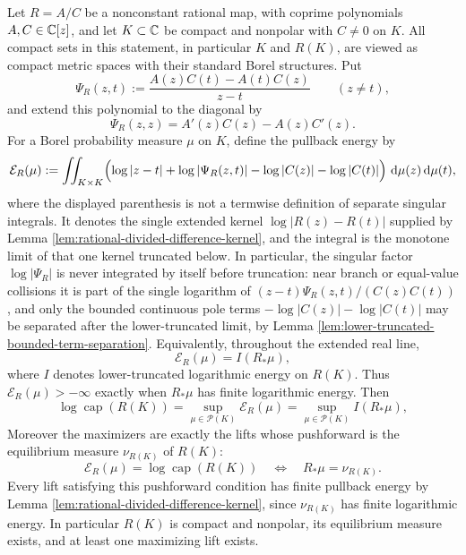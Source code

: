 \begin{proposition}\label{prop:general-rational-image-capacity-pullback}
Let \(R=A/C\) be a nonconstant rational map, with coprime polynomials \(A,C\in\mathbb{C}[z]\), and let \(K\subset\mathbb{C}\) be compact and nonpolar with \(C\ne0\) on \(K\).  All compact sets in this statement, in particular \(K\) and \(R(K)\), are viewed as compact metric spaces with their standard Borel structures.  Put
\[
\Psi_R(z,t):=\frac{A(z)C(t)-A(t)C(z)}{z-t}\qquad (z\ne t),
\]
and extend this polynomial to the diagonal by
\[
\Psi_R(z,z)=A'(z)C(z)-A(z)C'(z).
\]
For a Borel probability measure \(\mu\) on \(K\), define the pullback energy by
\[
\mathcal E_R(\mu):=\iint_{K\times K}
\Bigl(\log|z-t|+\log|\Psi_R(z,t)|-\log|C(z)|-\log|C(t)|\Bigr)
\,\,\mathrm{d}\mu(z)\,\mathrm{d}\mu(t),
\]
where the displayed parenthesis is not a termwise definition of separate singular integrals.  It denotes the single extended kernel \(\log|R(z)-R(t)|\) supplied by Lemma \ref{lem:rational-divided-difference-kernel}, and the integral is the monotone limit of that one kernel truncated below.  In particular, the singular factor \(\log|\Psi_R|\) is never integrated by itself before truncation: near branch or equal-value collisions it is part of the single logarithm of \((z-t)\Psi_R(z,t)/(C(z)C(t))\), and only the bounded continuous pole terms \(-\log|C(z)|-\log|C(t)|\) may be separated after the lower-truncated limit, by Lemma \ref{lem:lower-truncated-bounded-term-separation}.  Equivalently, throughout the extended real line,
\[
\mathcal E_R(\mu)=I(R_\ast\mu),
\]
where \(I\) denotes lower-truncated logarithmic energy on \(R(K)\).  Thus \(\mathcal E_R(\mu)>-\infty\) exactly when \(R_\ast\mu\) has finite logarithmic energy.  Then
\[
\boxed{\;
\log\operatorname{cap}(R(K))
=\sup_{\mu\in\mathcal P(K)}\mathcal E_R(\mu)
=\sup_{\mu\in\mathcal P(K)}I(R_\ast\mu),
\;}
\]
Moreover the maximizers are exactly the lifts whose pushforward is the equilibrium measure \(\nu_{R(K)}\) of \(R(K)\):
\[
\mathcal E_R(\mu)=\log\operatorname{cap}(R(K))
\quad\Longleftrightarrow\quad
R_\ast\mu=\nu_{R(K)}.
\]
Every lift satisfying this pushforward condition has finite pullback energy by Lemma \ref{lem:rational-divided-difference-kernel}, since \(\nu_{R(K)}\) has finite logarithmic energy.
In particular \(R(K)\) is compact and nonpolar, its equilibrium measure exists, and at least one maximizing lift exists.


\end{proposition}
